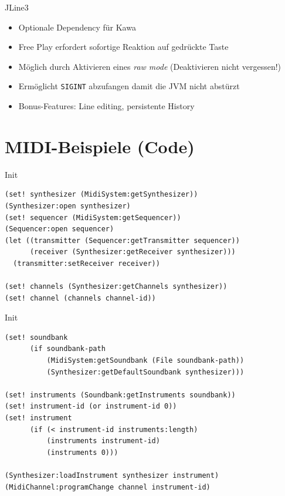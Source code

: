\documentclass[presentation]{beamer}
\begin{document}
\begin{frame}[fragile,label=sec-2-4]{JLine3}
 \begin{itemize}
\item Optionale Dependency für Kawa
\item Free Play erfordert sofortige Reaktion auf gedrückte Taste
\item Möglich durch Aktivieren eines \emph{raw mode} (Deaktivieren nicht
vergessen!)
\item Ermöglicht \texttt{SIGINT} abzufangen damit die JVM nicht abstürzt
\item Bonus-Features: Line editing, persistente History
\end{itemize}
\end{frame}

\section{MIDI-Beispiele (Code)}
\label{sec-3}

\begin{frame}[fragile,label=sec-3-1]{Init}
 \begin{verbatim}
(set! synthesizer (MidiSystem:getSynthesizer))
(Synthesizer:open synthesizer)
(set! sequencer (MidiSystem:getSequencer))
(Sequencer:open sequencer)
(let ((transmitter (Sequencer:getTransmitter sequencer))
      (receiver (Synthesizer:getReceiver synthesizer)))
  (transmitter:setReceiver receiver))

(set! channels (Synthesizer:getChannels synthesizer))
(set! channel (channels channel-id))
\end{verbatim}
\end{frame}

\begin{frame}[fragile,label=sec-3-2]{Init}
 \begin{verbatim}
(set! soundbank
      (if soundbank-path
          (MidiSystem:getSoundbank (File soundbank-path))
          (Synthesizer:getDefaultSoundbank synthesizer)))

(set! instruments (Soundbank:getInstruments soundbank))
(set! instrument-id (or instrument-id 0))
(set! instrument
      (if (< instrument-id instruments:length)
          (instruments instrument-id)
          (instruments 0)))

(Synthesizer:loadInstrument synthesizer instrument)
(MidiChannel:programChange channel instrument-id)
\end{verbatim}
\end{frame}
\end{document}

